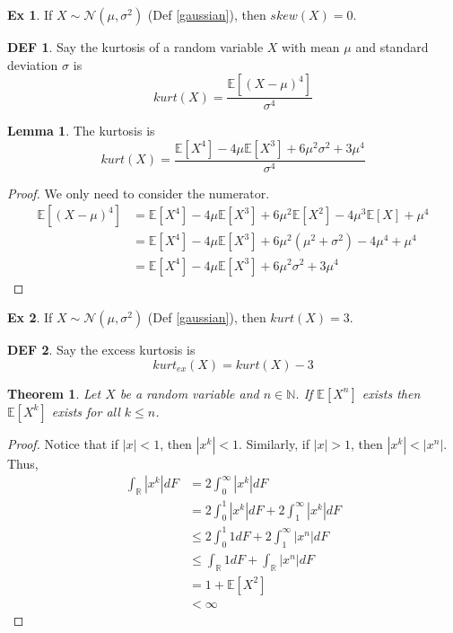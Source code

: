 \documentclass{article}
\newtheorem{theorem}{Theorem}
\theoremstyle{definition}\newtheorem{definition}{DEF}
\theoremstyle{definition}\newtheorem{example}{Ex}
\theoremstyle{lemma}\newtheorem{lemma}{Lemma}
\theoremstyle{corrolary}\newtheorem{corrolary}{Cor}
\begin{document}
\begin{example}
If $X \sim \mathcal{N}(\mu ,\sigma^2 )$ (Def \ref{gaussian}), then $skew(X)=0$.
\end{example}

\begin{definition}
Say the kurtosis of a random variable $X$ with mean $\mu$ and standard deviation $\sigma$ is
\begin{equation}
kurt(X) = \frac{\mathbb{E}[(X-\mu)^4]}{\sigma^4}
\end{equation}
\end{definition}

\begin{lemma}
The kurtosis is
\begin{equation}
kurt(X) = \frac{\mathbb{E}[X^4]-4\mu \mathbb{E}[X^3]+6\mu^2 \sigma^2 +3\mu^4}{\sigma^4}
\end{equation}
\end{lemma}
\begin{proof}
We only need to consider the numerator.
\begin{align*}
\mathbb{E}[(X-\mu)^4] &= \mathbb{E}[X^4] -4\mu \mathbb{E}[X^3] + 6\mu^2 \mathbb{E}[X^2] - 4\mu^3 \mathbb{E}[X]+\mu^4\\
&= \mathbb{E}[X^4] -4\mu \mathbb{E}[X^3] + 6\mu^2 (\mu^2 + \sigma^2) -4\mu^4 + \mu^4\\
&= \mathbb{E}[X^4] -4\mu \mathbb{E}[X^3] + 6\mu^2 \sigma^2 + 3\mu^4
\end{align*}
\end{proof}

\begin{example}
If $X\sim \mathcal{N}(\mu ,\sigma^2)$ (Def \ref{gaussian}), then $kurt(X)=3$.
\end{example}

\begin{definition}
Say the excess kurtosis is
\begin{equation}
kurt_{ex}(X)=kurt(X)-3
\end{equation}
\end{definition}

\begin{theorem}
Let $X$ be a random variable and $n\in \mathbb{N}$.
If $\mathbb{E}[X^n]$ exists then $\mathbb{E}[X^k]$ exists for all $k\leq n$.
\end{theorem}
\begin{proof}
Notice that if $|x|<1$, then $|x^k|<1$.
Similarly, if $|x|>1$, then $|x^k|<|x^n|$.
Thus,
\begin{align*}
\int_\mathbb{R} |x^k|dF &= 2 \int_0^\infty |x^k|dF\\
&= 2\int_0^1 |x^k| dF + 2\int_1^\infty |x^k| dF \\
&\leq 2\int_0^1 1dF + 2\int_1^\infty |x^n|dF\\
&\leq \int_\mathbb{R} 1dF + \int_\mathbb{R} |x^n|dF\\ &= 1 + \mathbb{E}[X^2]\\
&<\infty
\end{align*}
\end{proof}
\end{document}
